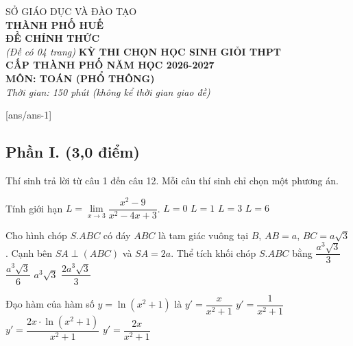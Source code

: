 \TitDe
{SỞ GIÁO DỤC VÀ ĐÀO TẠO\\ \textbf{THÀNH PHỐ HUẾ}\\ \textbf{ĐỀ CHÍNH THỨC}\\ \textit{(Đề có 04 trang)}}
{\textbf{KỲ THI CHỌN HỌC SINH GIỎI THPT}\\ \textbf{CẤP THÀNH PHỐ NĂM HỌC 2026-2027}\\ \textbf{MÔN: TOÁN (PHỔ THÔNG)}\\ \textit{Thời gian: 150 phút (không kể thời gian giao đề)}}

[ans/ans-1]
\subsection*{Phần I. (3,0 điểm)} Thí sinh trả lời từ câu 1 đến câu 12. Mỗi câu thí sinh chỉ chọn một phương án.
\setcounter{ex}{0}

\begin{ex}
	Tính giới hạn $L=\lim\limits_{x\to 3}\dfrac{x^2-9}{x^2-4x+3}$.
	\choice
	{$L=0$}
	{$L=1$}
	{\True $L=3$}
	{$L=6$}
\end{ex}

\begin{ex}
	Cho hình chóp $S.ABC$ có đáy $ABC$ là tam giác vuông tại $B$, $AB=a$, $BC=a\sqrt{3}$. Cạnh bên $SA\perp(ABC)$ và $SA=2a$. Thể tích khối chóp $S.ABC$ bằng
	\choice
	{\True $\dfrac{a^3\sqrt{3}}{3}$}
	{$\dfrac{a^3\sqrt{3}}{6}$}
	{$a^3\sqrt{3}$}
	{$\dfrac{2a^3\sqrt{3}}{3}$}
\end{ex}

\begin{ex}
	Đạo hàm của hàm số $y=\ln\left(x^2+1\right)$ là
	\choice
	{$y'=\dfrac{x}{x^2+1}$}
	{$y'=\dfrac{1}{x^2+1}$}
	{$y'=\dfrac{2x\cdot\ln\left(x^2+1\right)}{x^2+1}$}
	{\True $y'=\dfrac{2x}{x^2+1}$}
\end{ex}

